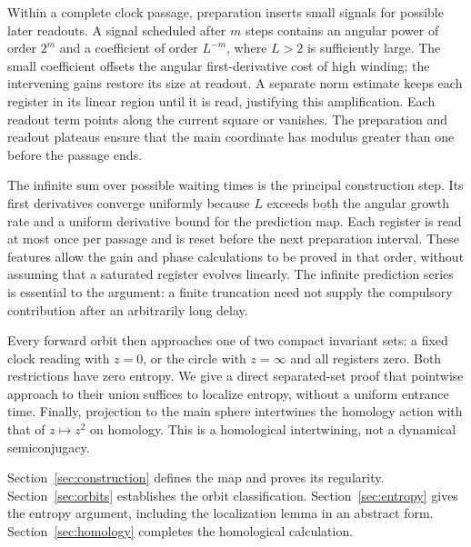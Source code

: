 \documentclass[11pt]{article}
\theoremstyle{definition}
\theoremstyle{remark}
\begin{document}
Within a complete clock passage, preparation inserts small signals for
possible later readouts. A signal scheduled after \(m\) steps contains
an angular power of order \(2^m\) and a coefficient of order \(L^{-m}\),
where \(L>2\) is sufficiently large. The small coefficient offsets the
angular first-derivative cost of high winding; the intervening gains
restore its size at readout. A separate norm estimate keeps each register
in its linear region until it is read, justifying this amplification.
Each readout
term points along the current square or vanishes. The preparation and
readout plateaus ensure that the main coordinate has modulus greater
than one before the passage ends.

The infinite sum over possible waiting times is the principal
construction step. Its first derivatives converge uniformly because
\(L\) exceeds both the angular growth rate and a uniform derivative
bound for the prediction map. Each register is read at most once per
passage and is reset before the next preparation interval. These
features allow the gain and phase calculations to be proved in that
order, without assuming that a saturated register evolves linearly.
The infinite prediction series is essential to the argument: a finite
truncation need not supply the compulsory contribution after an
arbitrarily long delay.

Every forward orbit then approaches one of two compact invariant sets:
a fixed clock reading with \(z=0\), or the circle with \(z=\infty\) and
all registers zero. Both restrictions have zero entropy. We give a direct
separated-set proof that pointwise approach to their union suffices to
localize entropy, without a uniform entrance time. Finally, projection
to the main sphere intertwines the homology action with that of
\(z\mapsto z^2\) on homology. This is a homological intertwining, not a
dynamical semiconjugacy.

Section~\ref{sec:construction} defines the map and proves its regularity.
Section~\ref{sec:orbits} establishes the orbit classification.
Section~\ref{sec:entropy} gives the entropy argument, including the
localization lemma in an abstract form.
Section~\ref{sec:homology} completes the homological calculation.







{}

\end{document}
